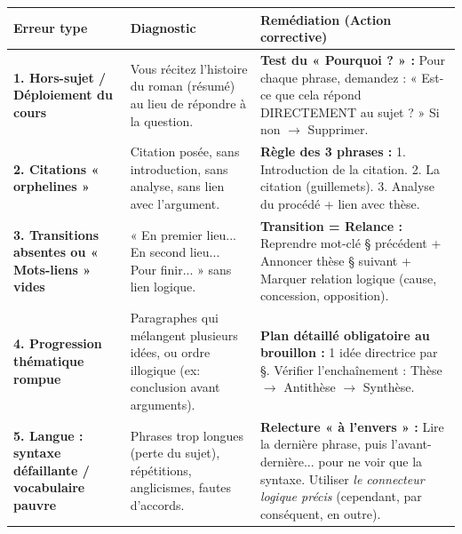 \documentclass[11pt]{article}
\begin{document}
\begin{center}
\begin{tabularx}{\linewidth}{|l|X|X|}
\hline
\rowcolor{popblueL}
\textbf{Erreur type} & \textbf{Diagnostic} & \textbf{Remédiation (Action corrective)} \\
\hline
\textbf{1. Hors-sujet / Déploiement du cours} & Vous récitez l'histoire du roman (résumé) au lieu de répondre à la question. & \textbf{Test du « Pourquoi ? » :} Pour chaque phrase, demandez : « Est-ce que cela répond DIRECTEMENT au sujet ? » Si non $\rightarrow$ Supprimer. \\
\hline
\textbf{2. Citations « orphelines »} & Citation posée, sans introduction, sans analyse, sans lien avec l'argument. & \textbf{Règle des 3 phrases :} 1. Introduction de la citation. 2. La citation (guillemets). 3. Analyse du procédé + lien avec thèse. \\
\hline
\textbf{3. Transitions absentes ou « Mots-liens » vides} & « En premier lieu... En second lieu... Pour finir... » sans lien logique. & \textbf{Transition = Relance :} Reprendre mot-clé § précédent + Annoncer thèse § suivant + Marquer relation logique (cause, concession, opposition). \\
\hline
\textbf{4. Progression thématique rompue} & Paragraphes qui mélangent plusieurs idées, ou ordre illogique (ex: conclusion avant arguments). & \textbf{Plan détaillé obligatoire au brouillon :} 1 idée directrice par §. Vérifier l'enchaînement : Thèse $\rightarrow$ Antithèse $\rightarrow$ Synthèse. \\
\hline
\textbf{5. Langue : syntaxe défaillante / vocabulaire pauvre} & Phrases trop longues (perte du sujet), répétitions, anglicismes, fautes d'accords. & \textbf{Relecture « à l'envers » :} Lire la dernière phrase, puis l'avant-dernière... pour ne voir que la syntaxe. Utiliser \emph{le connecteur logique précis} (cependant, par conséquent, en outre). \\
\hline
\end{tabularx}
\end{center}
\end{document}
